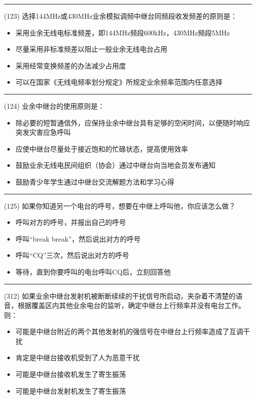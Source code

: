 \documentclass[twocolumn,hyperref,UTF8]{ctexart}  %
\begin{document}
\noindent\rule{0.5\textwidth}{1pt}
\heiti (123) 选择144MHz或430MHz业余模拟调频中继台同频段收发频差的原则是： \songti {\color{gray} [LK0037] }
\begin{itemize}
	\item  采用业余无线电标准频差，即144MHz频段600kHz，430MHz频段5MHz
	\item  尽量采用非标准频差以阻止一般业余无线电台占用
	\item  采用经常变换频差的办法减少占用度
	\item  可以在国家《无线电频率划分规定》所规定业余频率范围内任意选择
\end{itemize}


\noindent\rule{0.5\textwidth}{1pt}
\heiti (124) 业余中继台的使用原则是： \songti {\color{gray} [LK0275] }
\begin{itemize}
	\item  除必要的短暂通信外，应保持业余中继台具有足够的空闲时间，以便随时响应突发灾害应急呼叫
	\item  应使中继台尽量处于接近饱和的忙碌状态，提高使用效率
	\item  鼓励业余无线电民间组织（协会）通过中继台向当地会员发布通知
	\item  鼓励青少年学生通过中继台交流解题方法和学习心得
\end{itemize}


\noindent\rule{0.5\textwidth}{1pt}
\heiti (125) 如果你知道另一个电台的呼号，想要在中继上呼叫他，你应该怎么做？ \songti {\color{gray} [LK1096] }
\begin{itemize}
	\item  呼叫对方的呼号，并报出自己的呼号
	\item  呼叫“break break”，然后说出对方的呼号
	\item  呼叫“CQ”三次，然后说出对方的呼号
	\item  等待，直到你要呼叫的电台呼叫CQ后，立刻回答他
\end{itemize}


\noindent\rule{0.5\textwidth}{1pt}
\heiti (312) 如果业余中继台发射机被断断续续的干扰信号所启动，夹杂着不清楚的语音，根据覆盖区内其他业余电台的监听，确定中继台上行频率并没有电台工作。则： \songti {\color{gray} [LK0855] }
\begin{itemize}
	\item  可能是中继台附近的两个其他发射机的强信号在中继台上行频率造成了互调干扰
	\item  肯定是中继台接收机受到了人为恶意干扰
	\item  可能是中继台接收机发生了寄生振荡
	\item  可能是中继台发射机发生了寄生振荡
\end{itemize}
\end{document}
